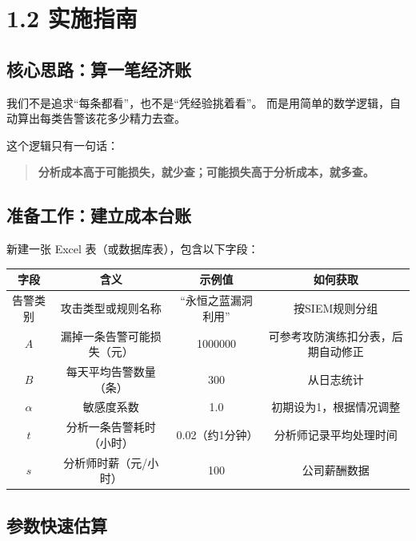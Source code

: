 \documentclass[11pt,a4paper]{article}
\begin{document}
\section{1.2 实施指南}

\subsection{核心思路：算一笔经济账}

我们不是追求“每条都看”，也不是“凭经验挑着看”。
而是用简单的数学逻辑，自动算出每类告警该花多少精力去查。

这个逻辑只有一句话：
\begin{quote}
\textbf{分析成本高于可能损失，就少查；可能损失高于分析成本，就多查。}
\end{quote}

\subsection{准备工作：建立成本台账}

新建一张 Excel 表（或数据库表），包含以下字段：

\begin{center}
\begin{tabular}{c|c|c|c}
\toprule
\textbf{字段} & \textbf{含义} & \textbf{示例值} & \textbf{如何获取} \\
\midrule
告警类别 & 攻击类型或规则名称 & “永恒之蓝漏洞利用” & 按SIEM规则分组 \\
$A$ & 漏掉一条告警可能损失（元） & 1000000 & 可参考攻防演练扣分表，后期自动修正 \\
$B$ & 每天平均告警数量（条） & 300 & 从日志统计 \\
$\alpha$ & 敏感度系数 & 1.0 & 初期设为1，根据情况调整 \\
$t$ & 分析一条告警耗时（小时） & 0.02（约1分钟） & 分析师记录平均处理时间 \\
$s$ & 分析师时薪（元/小时） & 100 & 公司薪酬数据 \\
\bottomrule
\end{tabular}
\end{center}

\subsection{参数快速估算}
\end{document}
